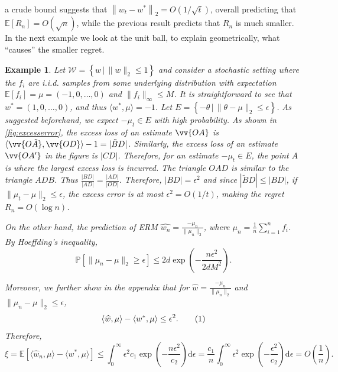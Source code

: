 \documentclass[english]{article}
\newcommand{\todor}[2][]{\todo[color=Blue!10,size=\tiny,#1]{R: #2}}
\newcommand{\cW}{\mathcal{W}}
\newcommand{\Exp}[1]{\mathbb{E}\left[ #1 \right]}
\newcommand{\inpro}[2]{\langle #1, #2\rangle}
\newcommand{\set}[2]{\left\{#1 \,\vert\, #2 \right\}}
\newcommand{\what}[1]{\widehat{#1}}
\newcommand{\norm}[1]{\left\| #1 \right\|}
\newcommand\numberthis{\addtocounter{equation}{1}\tag{\theequation}}
\newcommand{\Prob}[1]{\mathbb{P}\left[#1\right]}
\newtheorem{example}[thm]{Example}
\begin{document}
a crude bound suggests that $\norm{w_t-  w^* }_2 = O(1/\sqrt{t})$, overall predicting that 
$\Exp{R_n} = O(\sqrt{n})$, while the previous result predicts that $R_n$ is much smaller.
In the next example we look at the unit ball, to explain geometrically, what ``causes'' the smaller regret.
\begin{example}
	\label{exam:ERM}
Let $\cW = \set{w}{\|w\|_2\le 1}$ and
consider a stochastic setting where the $f_i$ are i.i.d. samples 
from some underlying distribution with expectation $\Exp{f_i} = \mu = (-1,0,\ldots,0)$ and $\|f_i\|_\infty\le M$.
It is straightforward to see that $w^* = (1,0,\ldots,0)$, and thus $\inpro{w^*}{\mu} = -1$.
Let $E = \set{-\theta}{\|\theta - \mu\|_2 \le \epsilon}$. As suggested beforehand, we expect $-\mu_t\in E$ with high probability.
As shown in \cref{fig:excesserror}, 
the excess loss of an estimate $\vv{OA}$ is $\inpro{\vv{O\tilde{A}}}{\vv{OD}} - 1 = |\tilde{B}D|$.
Similarly, the excess loss of an estimate $\vv{OA'}$ in the figure is $|{CD}|$.
Therefore, for an estimate $-\mu_t \in E$, the point $A$ is where the largest excess loss is incurred.
The triangle $OAD$ is similar to the triangle $ADB$. Thus $\frac{|BD|}{|AD|} = \frac{|AD|}{|OD|}$. Therefore, 
$|BD| = \epsilon^2$ and since $|{\tilde{B}D}| \le |{BD}|$, 
if $\|\mu_t - \mu\|_2 \le \epsilon$, the excess error is at most $\epsilon^2 = O(1/t)$, making the regret $R_n = O(\log n)$.

On the other hand, the prediction of ERM $\what{w_n} = \frac{-\mu_n}{\|\mu_n\|_2}$, where $\mu_n = \frac{1}{n}\sum_{i=1}^n f_i$.
By Hoeffding's inequality, 
\[
\Prob{ \|\mu_n - \mu\|_2 \ge \epsilon } \le 2d\exp\left(-\frac{n\epsilon^2}{2dM^2}\right).
\]

Moreover, we further show in the appendix that for $\what{w} = \frac{-\mu_n}{\|\mu_n\|_2}$ and $\|\mu_n - \mu\|_2 \le \epsilon$, 
\[
\inpro{\what{w}}{\mu} - \inpro{w^*}{\mu} \le \epsilon^2. \numberthis\label{eq:exampleloss}
\]
Therefore,
\[
\xi = \Exp{\inpro{\hat{w}_n}{\mu} - \inpro{w^*}{\mu}} \le \int_{0}^{\infty} \epsilon^2 c_1\exp\left(-\frac{n\epsilon^2}{c_2}\right) \text{d}\epsilon = \frac{c_1}{n}\int_{0}^{\infty} \epsilon^2\exp\left(-\frac{\epsilon^2}{c_2}\right) \text{d}\epsilon = O(\frac{1}{n}).
\]
\fi
\end{example}
\end{document}
